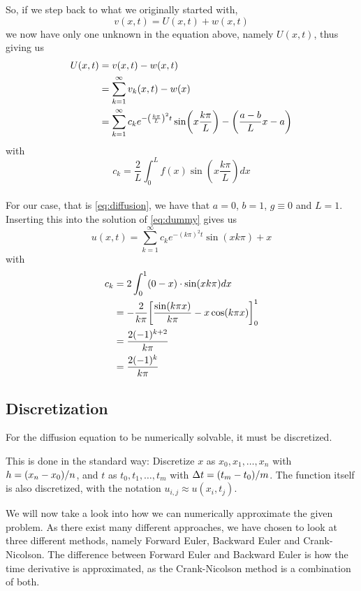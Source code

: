 \documentclass[12pt,english,a4paper]{article}
\begin{document}
So, if we step back to what we originally started with,
\[
v(x,t) = U(x,t) + w(x,t)
\]
we now have only one unknown in the equation above, namely \(U(x,t)\), thus giving us
\begin{align*}
 U(x,t) &= v(x,t)- w(x,t) \\
 &=  \sum_{k=1}^\infty v_k(x,t) - w(x) \\
 &=\sum_{k=1}^\infty c_ke^{-\qty(\frac{k \pi}{L})^2t}\sin(x\frac{k \pi}{L})  -\qty(\frac{a-b}{L}x - a)
\end{align*}
with
\[
c_k = \frac{2}{L}\int_0^Lf(x)\sin(x\frac{k \pi}{L})dx
\]
\hfill \\
For our case, that is \vref{eq:diffusion}, we have that \(a = 0\), \(b = 1\), \(g \equiv 0\) and \(L = 1\). Inserting this into the solution of \vref{eq:dummy} gives us
\begin{equation}\label{eq:analyticalSolution}
	u(x,t) = \sum_{k=1}^\infty c_ke^{-(k\pi)^2t}\sin(xk\pi)  + x
\end{equation}
with
\begin{align*}
c_k &= 2\int_0^1(0-x)\cdot\sin(xk\pi)dx \\
&= - \frac{2}{k\pi}\qty[\frac{\sin(k\pi x)}{k\pi} - x\cos(k\pi x)]_0^1 \\
&= \frac{2(-1)^{k+2}}{k\pi} \\
&=  \frac{2(-1)^k}{k\pi}
\end{align*}

\subsection{Discretization}


For the diffusion equation to be numerically solvable, it must be discretized.

This is done in the standard way: Discretize \(x\) as \(x_0,x_1,\dots,x_n\) with \(h=\qty(x_n-x_0)/n\), and \(t\) as \(t_0,t_1,\dots,t_m\) with \(\Delta t = \qty(t_m-t_0)/m\). The function itself is also discretized, with the notation \(u_{i,j} \approx u(x_i,t_j)\).

We will now take a look into how we can numerically approximate the given problem. As there exist many different approaches, we have chosen to look at three different methods, namely Forward Euler, Backward Euler and Crank-Nicolson. The difference between Forward Euler and Backward Euler is how the time derivative is approximated, as the Crank-Nicolson method is a combination of both.
%
\end{document}
